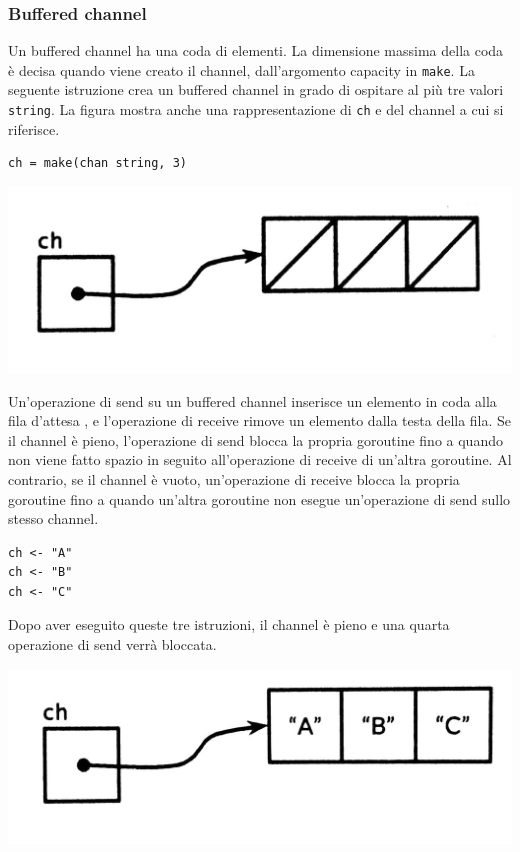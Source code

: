 \documentclass[../../../thesis.tex]{subfiles}
\begin{document}
    \subsubsection{Buffered channel}
    Un buffered channel ha una coda di elementi.
    La dimensione massima della coda è decisa quando viene creato il channel, dall'argomento capacity in \verb"make".
    La seguente istruzione crea un buffered channel in grado di ospitare al più tre valori \verb"string".
    La figura mostra anche una rappresentazione di \verb"ch" e del channel a cui si riferisce.
    \begin{lstlisting}[frame = single,label={lst:lstlisting7-4-4.1}]
ch = make(chan string, 3)
    \end{lstlisting}
    \center\includegraphics[scale = 0.125]{figure-8.2}

    \justifying\noindent Un'operazione di send su un buffered channel inserisce un elemento in coda alla fila d'attesa , e l'operazione di receive rimove un elemento dalla testa della fila.
    Se il channel è pieno, l'operazione di send blocca la propria goroutine fino a quando non viene fatto spazio in seguito all'operazione di receive di un'altra goroutine.
    Al contrario, se il channel è vuoto, un'operazione di receive blocca la propria goroutine fino a quando un'altra goroutine non esegue un'operazione di send sullo stesso channel.
    \begin{lstlisting}[frame = single,label={lst:lstlisting7-4-4.2}]
ch <- "A"
ch <- "B"
ch <- "C"
    \end{lstlisting}
    Dopo aver eseguito queste tre istruzioni, il channel è pieno e una quarta operazione di send verrà bloccata.
    \begin{center}
        \includegraphics[scale = 0.125]{figure-8.3}
    \end{center}
\end{document}
